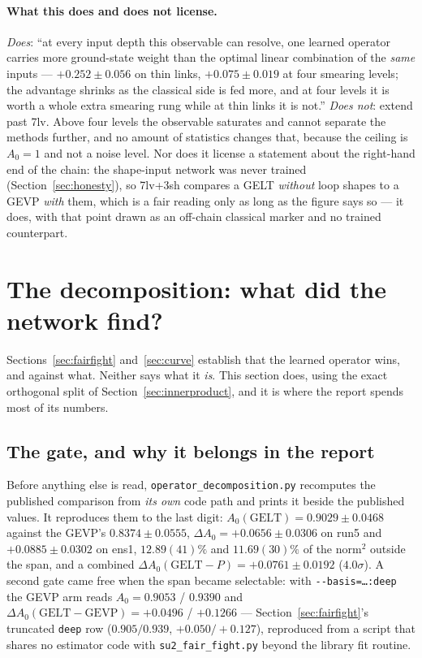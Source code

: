 \documentclass[11pt,a4paper]{article}
\newcommand{\Azero}{A_0}
\newcommand{\dAzero}{\Delta A_0}
\newcommand{\arm}[1]{\texttt{#1}}
\begin{document}
\paragraph{What this does and does not license.} \emph{Does}: ``at every input
depth this observable can resolve, one learned operator carries more
ground-state weight than the optimal linear combination of the \emph{same}
inputs --- $+0.252 \pm 0.056$ on thin links, $+0.075 \pm 0.019$ at four smearing
levels; the advantage shrinks as the classical side is fed more, and at four
levels it is worth a whole extra smearing rung while at thin links it is not.''
\emph{Does not}: extend past 7lv. Above four levels the observable saturates and
cannot separate the methods further, and no amount of statistics changes that,
because the ceiling is $\Azero = 1$ and not a noise level. Nor does it license a
statement about the right-hand end of the chain: the shape-input network was
never trained (Section~\ref{sec:honesty}), so 7lv+3sh compares a GELT
\emph{without} loop shapes to a GEVP \emph{with} them, which is a fair reading
only as long as the figure says so --- it does, with that point drawn as an
off-chain classical marker and no trained counterpart.

\section{The decomposition: what did the network find?}
\label{sec:decomp}

Sections~\ref{sec:fairfight} and~\ref{sec:curve} establish that the learned
operator wins, and against what. Neither says what it \emph{is}. This section
does, using the exact orthogonal split of Section~\ref{sec:innerproduct}, and it
is where the report spends most of its numbers.

\subsection{The gate, and why it belongs in the report}
\label{sec:gate}

Before anything else is read, \texttt{operator\_decomposition.py} recomputes the
published comparison from \emph{its own} code path and prints it beside the
published values. It reproduces them to the last digit: $\Azero(\text{GELT}) =
0.9029 \pm 0.0468$ against the GEVP's $0.8374 \pm 0.0555$, $\dAzero = +0.0656
\pm 0.0306$ on run5 and $+0.0885 \pm 0.0302$ on ens1, $12.89(41)\%$ and
$11.69(30)\%$ of the norm${}^2$ outside the span, and a combined
$\dAzero(\text{GELT} - P) = +0.0761 \pm 0.0192$ ($4.0\sigma$). A second gate came
free when the span became selectable: with \texttt{-{}-basis=\dots:deep} the
GEVP arm reads $\Azero = 0.9053$ / $0.9390$ and $\dAzero(\text{GELT} -
\text{GEVP}) = +0.0496$ / $+0.1266$ --- Section~\ref{sec:fairfight}'s truncated
\arm{deep} row ($0.905/0.939$, $+0.050/+0.127$), reproduced from a script that
shares no estimator code with \texttt{su2\_fair\_fight.py} beyond the library fit
routine.
\end{document}
